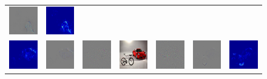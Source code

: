\begin{figure}
\begin{center}
\begin{tabular}{ccccccc}
\includegraphics[width=0.13\linewidth]{figs/examples/googlenet/soft/dog-cat4_diff_286} &
\includegraphics[width=0.13\linewidth]{figs/examples/googlenet/soft/dog-cat4_sali_286} \\
\includegraphics[width=0.13\linewidth]{figs/examples/googlenet/soft/bic-car1_sali_818} &
\includegraphics[width=0.13\linewidth]{figs/examples/googlenet/soft/bic-car1_diff_818} &
\includegraphics[width=0.13\linewidth]{figs/examples/googlenet/oxford/bic-car1_diff_818} &
\includegraphics[width=0.13\linewidth]{figs/examples/googlenet/oxford/bic-car1} &
\includegraphics[width=0.13\linewidth]{figs/examples/googlenet/oxford/bic-car1_diff_672} &
\includegraphics[width=0.13\linewidth]{figs/examples/googlenet/soft/bic-car1_diff_672} &
\includegraphics[width=0.13\linewidth]{figs/examples/googlenet/soft/bic-car1_sali_672} \\

\end{tabular}
\end{center}
\end{figure}
